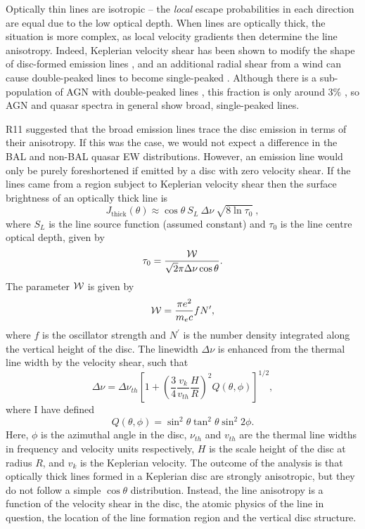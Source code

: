 Optically thin lines are isotropic -- the {\em local}
escape probabilities in each direction are equal due to the 
low optical depth. When lines are optically thick, the situation is more
complex, as local velocity gradients then determine the line 
anisotropy. Indeed, Keplerian velocity shear has been shown to modify the
shape of disc-formed emission lines \citep{hornemarsh1986}, and an additional
radial shear from a wind can cause double-peaked lines
to become single-peaked \citep{MC96,MC97,flohic2012}. 
Although there is a sub-population of AGN with double-peaked lines 
\citep[e.g.][]{eracleous1994,eracleous2003},
this fraction is only around $3\%$ \citep{strateva2003}, so
AGN and quasar spectra in general show broad, single-peaked lines. 

R11 suggested that the broad emission lines trace the disc
emission in terms of their anisotropy. 
If this was the case, we would not expect a difference in the BAL and non-BAL
quasar EW distributions. However, an emission line would only be purely 
foreshortened if emitted by a disc with zero velocity shear. 
If the lines came from a region subject to
Keplerian velocity shear then the surface brightness of an optically thick 
line is \citep{hornemarsh1986}
\begin{equation}
J_{\mathrm{thick}}(\theta) \approx \cos \theta~S_L~\Delta \nu~\sqrt{8 \ln \tau_0} \ ,
\end{equation}
where $S_L$ is the line source function (assumed constant) and
$\tau_0$ is the line centre optical depth, given by
\begin{equation}
\tau_0 = \frac{{\cal W}}{\sqrt{2}\pi \Delta \nu \cos \theta}.
\end{equation}
The parameter ${{\cal W}}$ is given by
\begin{equation}
{{\cal W}} = \frac{\pi e^2}{m_e c}f N^\prime,
\end{equation}
where $f$ is the oscillator strength and $N^\prime$ is the number
density integrated along the vertical height of the disc. The linewidth
$\Delta \nu$ is enhanced from the thermal line width by the velocity shear, such
that
\begin{equation}
\Delta \nu = \Delta \nu_{th} \left[1 + 
\left(\frac{3}{4}\frac{v_{k}}{v_{th}}\frac{H}{R}\right)^2
Q(\theta, \phi)
\right]^{1/2},
\end{equation}
where I have defined
\begin{equation}
Q(\theta, \phi) =
\sin^2 \theta \tan^2 \theta \sin^2 2 \phi.
\end{equation}
Here, $\phi$ is the azimuthal angle in the disc, $\nu_{th}$ and $v_{th}$ are the 
thermal line widths in frequency and velocity units respectively, 
$H$ is the scale height of the disc at radius $R$, and $v_k$ is the
Keplerian velocity. The outcome of the \cite{hornemarsh1986} analysis is that optically thick lines 
formed in a Keplerian disc are strongly anisotropic, but they do not follow a simple 
$\cos \theta$ distribution. Instead, the line anisotropy is
a function of the velocity shear in the disc, the atomic physics of
the line in question, the location of the line formation region 
and the vertical disc structure. 

